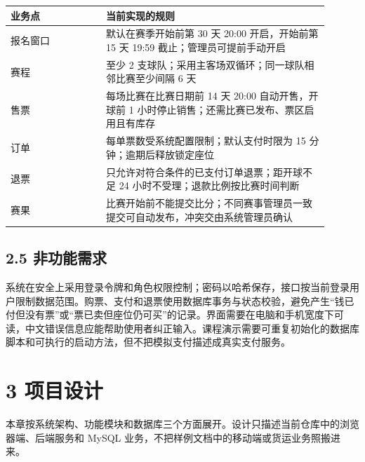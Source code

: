 \documentclass[UTF8,zihao=-4,a4paper]{ctexart}
\begin{document}
\begin{longtable}{@{}>{\raggedright\arraybackslash}p{0.27\linewidth}>{\raggedright\arraybackslash}p{0.63\linewidth}@{}}\toprule

\textbf{业务点} & \textbf{当前实现的规则} \\\midrule

报名窗口 & 默认在赛季开始前第 30 天 20:00 开启，开始前第 15 天 19:59 截止；管理员可提前手动开启 \\

赛程 & 至少 2 支球队；采用主客场双循环；同一球队相邻比赛至少间隔 6 天 \\

售票 & 每场比赛在比赛日期前 14 天 20:00 自动开售，开球前 1 小时停止销售；还需比赛已发布、票区启用且有库存 \\

订单 & 每单票数受系统配置限制；默认支付时限为 15 分钟；逾期后释放锁定座位 \\

退票 & 只允许对符合条件的已支付订单退票；距开球不足 24 小时不受理；退款比例按比赛时间判断 \\

赛果 & 比赛开始前不能提交比分；不同赛事管理员一致提交可自动发布，冲突交由系统管理员确认 \\

\bottomrule\end{longtable}

\subsection*{2.5 非功能需求}

系统在安全上采用登录令牌和角色权限控制；密码以哈希保存，接口按当前登录用户限制数据范围。购票、支付和退票使用数据库事务与状态校验，避免产生“钱已付但没有票”或“票已卖但座位仍可买”的记录。界面需要在电脑和手机宽度下可读，中文错误信息应能帮助使用者纠正输入。课程演示需要可重复初始化的数据库脚本和可执行的启动方法，但不把模拟支付描述成真实支付服务。


\section*{3 项目设计}

本章按系统架构、功能模块和数据库三个方面展开。设计只描述当前仓库中的浏览器端、后端服务和 MySQL 业务，不把样例文档中的移动端或货运业务照搬进来。
\end{document}
